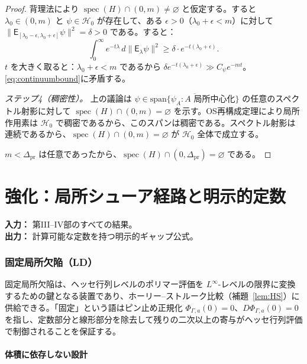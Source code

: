 \documentclass[12pt]{article}
\theoremstyle{plain}
\theoremstyle{definition}
\numberwithin{equation}{section}
\newcommand{\spec}{\operatorname{spec}}
\newcommand{\pr}{\mathrm{pr}}
\begin{document}
\begin{proof}
背理法により $\spec(H)\cap(0,m)\neq\varnothing$ と仮定する。すると $\lambda_0\in(0,m)$ と $\psi\in\mathcal{H}_0$ が存在して、ある $\epsilon>0$（$\lambda_0+\epsilon<m$）に対して $\|\mathsf{E}_{[\lambda_0-\epsilon,\lambda_0+\epsilon]}\psi\|^2=\delta>0$ である。すると：
\begin{equation}
\int_0^\infty e^{-t\lambda}\,d\|\mathsf{E}_\lambda\psi\|^2 \geq \delta\cdot e^{-t(\lambda_0+\epsilon)}.
\end{equation}
$t$ を大きく取ると：$\lambda_0+\epsilon<m$ であるから $\delta e^{-t(\lambda_0+\epsilon)}\gg C_\psi e^{-mt}$。\eqref{eq:continuumbound}に矛盾する。

\emph{ステップ4（稠密性）。}
上の議論は $\psi\in\overline{\mathrm{span}\{\psi_A:A\text{ 局所中心化}\}}$ の任意のスペクトル射影に対して $\spec(H)\cap(0,m)=\varnothing$ を示す。OS再構成定理により局所作用素は $\mathcal{H}_0$ で稠密であるから、このスパンは稠密である。スペクトル射影は連続であるから、$\spec(H)\cap(0,m)=\varnothing$ が $\mathcal{H}_0$ 全体で成立する。

$m<\Delta_{\pr}$ は任意であったから、$\spec(H)\cap(0,\Delta_{\pr})=\varnothing$ である。
\end{proof}



\part{強化：局所シューア経路と明示的定数}

\noindent\textbf{入力：} 第III--IV部のすべての結果。\\
\textbf{出力：} 計算可能な定数を持つ明示的ギャップ公式。

\section{固定局所欠陥（LD）}\label{sec:LD}

固定局所欠陥は、ヘッセ行列レベルのポリマー評価を $L^\infty$-レベルの限界に変換するための鍵となる装置であり、ホーリー--ストルーク比較（補題~\ref{lem:HS}）に供給できる。「固定」という語はピン止め正規化 $\Phi_{\Gamma,a}(0)=0$、$D\Phi_{\Gamma,a}(0)=0$ を指し、定数部分と線形部分を除去して残りの二次以上の寄与がヘッセ行列評価で制御されることを保証する。

\subsection{体積に依存しない設計}
\end{document}
